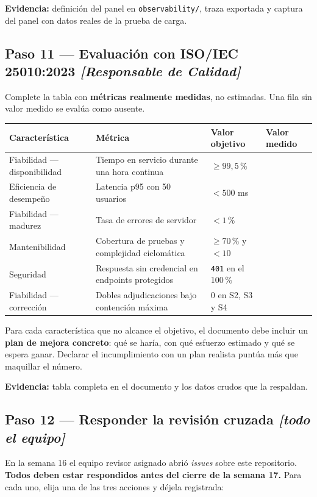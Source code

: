 \documentclass[11pt,a4paper]{article}
\newcommand{\paso}[1]{\subsection{#1}}
\begin{document}
	\textbf{Evidencia:} definición del panel en \texttt{observability/}, traza exportada y captura del panel con datos reales de la prueba de carga.
	
	\paso{Paso 11 --- Evaluación con ISO/IEC 25010:2023 \emph{[Responsable de Calidad]}}
	
	Complete la tabla con \textbf{métricas realmente medidas}, no estimadas. Una fila sin valor medido se evalúa como ausente.
	
	\begin{center}
		\small
		\begin{tabular}{@{}p{3.5cm}p{5.6cm}p{2.6cm}p{2.6cm}@{}}
			\toprule
			\textbf{Característica} & \textbf{Métrica} & \textbf{Valor objetivo} & \textbf{Valor medido} \\
			\midrule
			Fiabilidad --- disponibilidad & Tiempo en servicio durante una hora continua & $\geq 99{,}5\,\%$ & \\
			Eficiencia de desempeño & Latencia p95 con 50 usuarios & $< 500$ ms & \\
			Fiabilidad --- madurez & Tasa de errores de servidor & $< 1\,\%$ & \\
			Mantenibilidad & Cobertura de pruebas y complejidad ciclomática & $\geq 70\,\%$ y $< 10$ & \\
			Seguridad & Respuesta sin credencial en endpoints protegidos & \texttt{401} en el 100\,\% & \\
			Fiabilidad --- corrección & Dobles adjudicaciones bajo contención máxima & $0$ en S2, S3 y S4 & \\
			\bottomrule
		\end{tabular}
	\end{center}
	
	Para cada característica que no alcance el objetivo, el documento debe incluir un \textbf{plan de mejora concreto}: qué se haría, con qué esfuerzo estimado y qué se espera ganar. Declarar el incumplimiento con un plan realista puntúa más que maquillar el número.
	
	\textbf{Evidencia:} tabla completa en el documento y los datos crudos que la respaldan.
	
	\paso{Paso 12 --- Responder la revisión cruzada \emph{[todo el equipo]}}
	
	En la semana 16 el equipo revisor asignado abrió \emph{issues} sobre este repositorio. \textbf{Todos deben estar respondidos antes del cierre de la semana 17.} Para cada uno, elija una de las tres acciones y déjela registrada:
	
\end{document}
